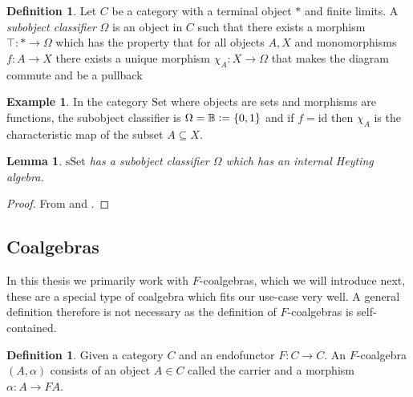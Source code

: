 \documentclass[12pt]{article}
\newtheorem{lemma}[theorem]{Lemma}
\theoremstyle{definition}
\newtheorem{definition}[theorem]{Definition}
\newtheorem{example}[theorem]{Example}
\newcommand{\defeq}{\vcentcolon=}
\newcommand{\1}{\mathbbm{1}}
\newcommand{\id}{\text{id}}
\begin{document}
\begin{definition}
    Let $C$ be a category with a terminal object $*$ and finite limits. A \emph{subobject classifier} $\Omega$ is an object in $C$ such that there exists a morphism $\top: * \to \Omega$ which has the property that for all objects $A, X$ and monomorphisms $f: A\to X$ there exists a unique morphism $\chi_A: X\to \Omega$ that makes the diagram commute and be a pullback
    \begin{center}
    \end{center}
\end{definition}

\begin{example}
    In the category $\mathrm{Set}$ where objects are sets and morphisms are functions, the subobject classifier is $\Omega = \mathbb{B} \defeq \{0,1\}$ and if $f = \id$ then $\chi_A$ is the characteristic map of the subset $A\subseteq X$.
\end{example}

\begin{lemma}
    $\mathrm{sSet}$ has a subobject classifier $\Omega$ which has an internal Heyting algebra.
\end{lemma}

\begin{proof}
    From \cite[Lemma.~1.6.6]{Elephant} and \cite[Lemma.~1.6.3.ii]{Elephant}.
\end{proof}

\subsection{Coalgebras}
In this thesis we primarily work with $F$-coalgebras, which we will introduce next, these are a special type of coalgebra which fits our use-case very well. A general definition therefore is not necessary as the definition of $F$-coalgebras is self-contained.

\begin{definition}
    Given a category $C$ and an endofunctor $F: C \to C$. An $F$-coalgebra $(A,\alpha)$ consists of an object $A\in C$ called the carrier and a morphism $\alpha: A\to FA$.
\end{definition}
\end{document}
